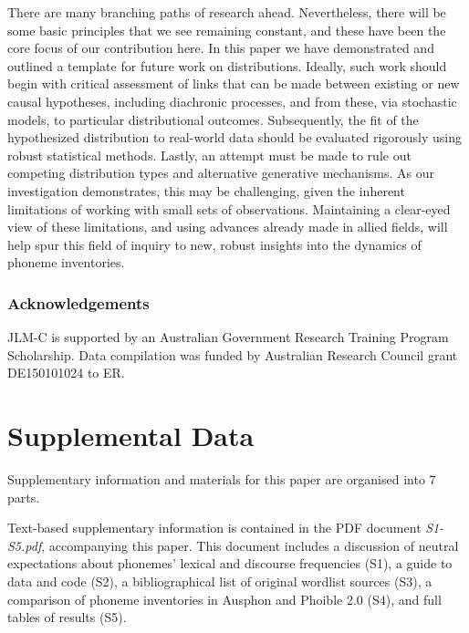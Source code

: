 There are many branching paths of research ahead. Nevertheless, there will be some basic principles that we see remaining constant, and these have been the core focus of our contribution here. In this paper we have demonstrated and outlined a template for future work on distributions. Ideally, such work should begin with critical assessment of links that can be made between existing or new causal hypotheses, including diachronic processes, and from these, via stochastic models, to particular distributional outcomes. Subsequently, the fit of the hypothesized distribution to real-world data should be evaluated rigorously using robust statistical methods. Lastly, an attempt must be made to rule out competing distribution types and alternative generative mechanisms. As our investigation demonstrates, this may be challenging, given the inherent limitations of working with small sets of observations. Maintaining a clear-eyed view of these limitations, and using advances already made in allied fields, will help spur this field of inquiry to new, robust insights into the dynamics of phoneme inventories.

\hypertarget{Acknowledgements}{%
\subsubsection{Acknowledgements}\label{Acknowledgements}}

JLM-C is supported by an Australian Government Research Training Program Scholarship. Data compilation was funded by Australian Research Council grant DE150101024 to ER.

\hypertarget{supplemental-data}{%
\section*{Supplemental Data}\label{supplemental-data}}

Supplementary information and materials for this paper are organised into 7 parts.

Text-based supplementary information is contained in the PDF document \emph{S1-S5.pdf}, accompanying this paper. This document includes a discussion of neutral expectations about phonemes' lexical and discourse frequencies (S1), a guide to data and code (S2), a bibliographical list of original wordlist sources (S3), a comparison of phoneme inventories in Ausphon and Phoible 2.0 (S4), and full tables of results (S5).

